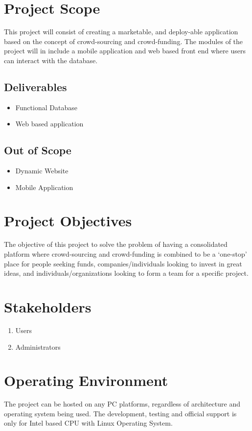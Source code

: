 \documentclass{scrreprt}
\begin{document}
\section{Project Scope}
This project will consist of creating a marketable, and deploy-able application based on the concept of crowd-sourcing and crowd-funding. The modules of the project will in include a mobile application and web based front end where users can interact with the database.

\subsection{Deliverables}
\begin{itemize}
  \item Functional Database
  \item Web based application
\end{itemize}

\subsection{Out of Scope}
\begin{itemize}
  \item Dynamic Website
  \item Mobile Application
\end{itemize}

\section{Project Objectives}
The objective of this project to solve the problem of having a consolidated platform where crowd-sourcing and crowd-funding is combined to be a ‘one-stop’ place for people seeking funds, companies/individuals looking to invest in great ideas, and individuals/organizations looking to form a team for a specific project.

\section{Stakeholders}
\begin{enumerate}
  \item Users
  \item Administrators
\end{enumerate}

\section{Operating Environment}
The project can be hosted on any PC platforms, regardless of architecture and operating system being used. The development, testing and official support is only for Intel based CPU with Linux Operating System.
\end{document}

